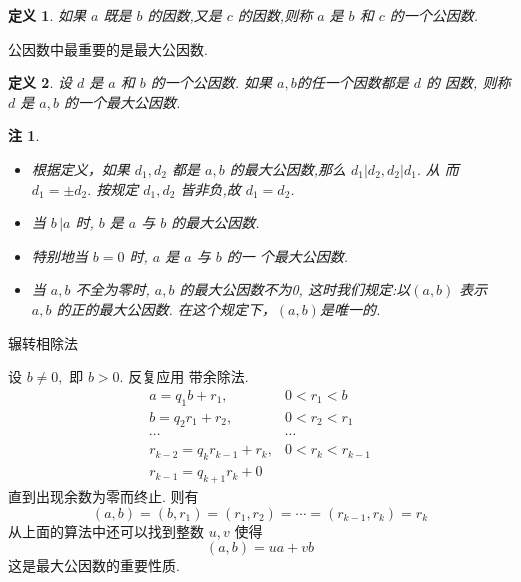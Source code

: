 \documentclass[13pt,punct]{ctexbeamer}
\newtheorem*{defi}{定义}
\newtheorem*{rem}{注}
\begin{document}
\begin{frame}
\begin{defi}
如果 $a$ 既是 $b$ 的因数,又是 $c$ 的因数,则称 $a$ 是 $b$ 和 $c$ 的一个\alert{公因数}.
\end{defi}
公因数中最重要的是最大公因数.

\begin{defi}
设 $d$ 是 $a$ 和 $b$ 的一个公因数. 如果 $a, b $的任一个因数都是 $d$ 的
因数, 则称 $d$ 是 $a, b$ 的一个\alert{最大公因数}.
\end{defi}

\begin{rem}
	\begin{itemize}
\item 根据定义，如果 $d_{1}, d_{2}$ 都是 $a, b$ 的最大公因数,那么 $d_{1}\left|d_{2}, d_{2}\right| d_{1} .$ 从
而 $d_{1}=\pm d_{2} .$
按规定 $d_{1}, d_{2}$ 皆非负,故 $d_{1}=d_{2}$.

\item 当 $b\,  | a$ 时, $b$ 是 $a$ 与 $b$ 的最大公因数.

\item 特别地当 $b=0$ 时, $a$ 是 $a$ 与 $b$ 的一 个最大公因数.

\item 当 $a, b$  不全为零时, $a,b$ 的最大公因数不为0,  这时我们规定:以$(a, b)$ 表示 $a, b$ 的正的最大公因数. 在这个规定下，$(a, b)$是唯一的.
\end{itemize}
\end{rem}
\end{frame}

\begin{frame}{辗转相除法}

设 $b \neq 0,$ 即 $b>0 .$ 反复应用 带余除法.
	\[
	\begin{array}{cc}
	a=q_{1} b+r_{1}, & 0<r_{1}<b \\
	b=q_{2} r_{1}+r_{2}, & 0<r_{2}<r_{1} \\
	\cdots  & \cdots  \\
	r_{k-2}=q_{k} r_{k-1}+r_{k}, & 0<r_{k}<r_{k-1} \\
	r_{k-1}=q_{k+1} r_{k}+0
	\end{array}
	\]
	直到出现余数为零而终止. 则有
	\[
	(a, b)=\left(b, r_{1}\right)=\left(r_{1}, r_{2}\right)=\cdots=\left(r_{k-1}, r_{k}\right)=r_{k}
	\]
	从上面的算法中还可以找到整数 $u, v$ 使得
	\[
	(a, b)=u a+v b
	\]
	这是最大公因数的重要性质.
\end{frame}
\end{document}
